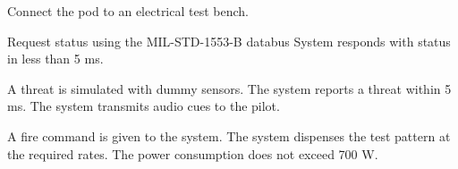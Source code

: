 \documentclass[Main]{subfiles}
\begin{document}
\begin{TestCase}
\TC
{Connect the pod to an electrical test bench.}
{}

\TC
{Request status using the MIL-STD-1553-B databus}
{System responds with status in less than 5 ms.}

\TC
{A threat is simulated with dummy sensors.}
{The system reports a threat within 5 ms.
The system transmits audio cues to the pilot.}


\TC
{A fire command is given to the system.}
{The system dispenses the test pattern at the required rates.
The power consumption does not exceed 700 W.}

\end{TestCase}
\end{document}
